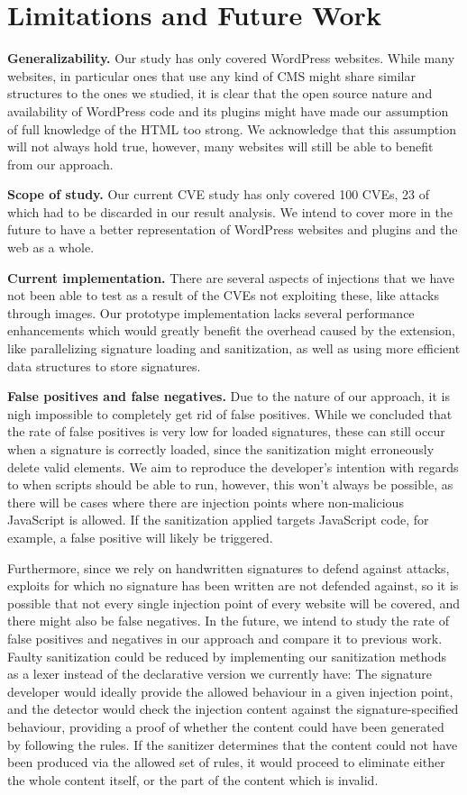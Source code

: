 \section{Limitations and Future Work}
\textbf{Generalizability.} Our study has only covered WordPress websites. While many websites, in particular ones that use any kind of CMS might share similar structures to the ones we studied, it is clear that the open source nature and availability of WordPress code and its plugins might have made our assumption of full knowledge of the HTML too strong. We acknowledge that this assumption will not always hold true, however, many websites will still be able to benefit from our approach.

\textbf{Scope of study.} Our current CVE study has only covered 100 CVEs, 23 of which had to be discarded in our result analysis. We intend to cover more in the future to have a better representation of WordPress websites and plugins and the web as a whole. 

\textbf{Current implementation.} There are several aspects of injections that we have not been able to test as a result of the CVEs not exploiting these, like attacks through images. Our prototype implementation lacks several performance enhancements which would greatly benefit the overhead caused by the extension, like parallelizing signature loading and sanitization, as well as using more efficient data structures to store signatures. 

\textbf{False positives and false negatives.} Due to the nature of our approach, it is nigh impossible to completely get rid of false positives. While we concluded that the rate of false positives is very low for loaded signatures, these can still occur when a signature is correctly loaded, since the sanitization might erroneously delete valid elements. We aim to reproduce the developer's intention with regards to when scripts should be able to run, however, this won't always be possible, as there will be cases where there are injection points where non-malicious JavaScript is allowed. If the sanitization applied targets JavaScript code, for example, a false positive will likely be triggered.

 Furthermore, since we rely on handwritten signatures to defend against attacks, exploits for which no signature has been written are not defended against, so it is possible that not every single injection point of every website will be covered, and there might also be false negatives. In the future, we intend to study the rate of false positives and negatives in our approach and compare it to previous work. Faulty sanitization could be reduced by implementing our sanitization methods as a lexer instead of the declarative version we currently have: The signature developer would ideally provide the allowed behaviour in a given injection point, and the detector would check the injection content against the signature-specified behaviour, providing a proof of whether the content could have been generated by following the rules. If the sanitizer determines that the content could not have been produced via the allowed set of rules, it would proceed to eliminate either the whole content itself, or the part of the content which is invalid.

